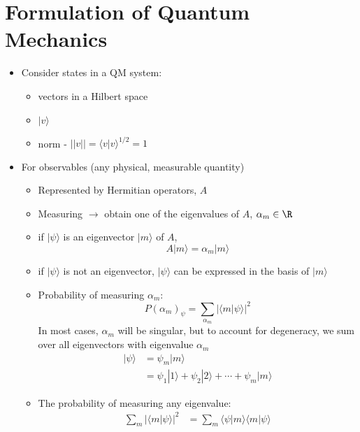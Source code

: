 \documentclass[cplx.tex]{subfiles}
\begin{document}
\chapter{Formulation of Quantum Mechanics}
\begin{itemize}
    \item Consider states in a QM system:
        \begin{itemize}
            \item vectors in a Hilbert space
            \item $|v\rangle$
            \item norm - $||v|| = \langle v|v\rangle^{1/2} = 1$
        \end{itemize}
    \item For observables (any physical, measurable quantity)
        \begin{itemize}
            \item Represented by Hermitian operators, $A$
            \item Measuring $\to$ obtain one of the eigenvalues of $A$, $\alpha_m \in \R$
            \item if $|\psi\rangle$ is an eigenvector $|m\rangle$ of $A$, 
                \begin{equation}
                    A|m\rangle = \alpha_m|m\rangle
                \end{equation}
            \item if $|\psi\rangle$ is not an eigenvector, $|\psi\rangle$ can be expressed in the basis of $|m\rangle$
            \item Probability of measuring $\alpha_m$:
                \begin{equation}
                    P(\alpha_m)_\psi = \sum_{\alpha_m} |\langle m|\psi\rangle|^2
                \end{equation}
                In most cases, $\alpha_m$ will be singular, but to account for degeneracy, we sum over all eigenvectors with eigenvalue $\alpha_m$
                \begin{align}
                    |\psi\rangle &= \psi_m|m\rangle \\
                                 &= \psi_1|1\rangle + \psi_2|2\rangle + \cdots + \psi_m|m\rangle
                \end{align}
            \item The probability of measuring any eigenvalue:
                \begin{align}
                    \sum_m |\langle m|\psi\rangle|^2 &= \sum_m \langle \psi|m\rangle \langle m|\psi\rangle \\

\end{align}
\end{itemize}
\end{itemize}
\end{document}
